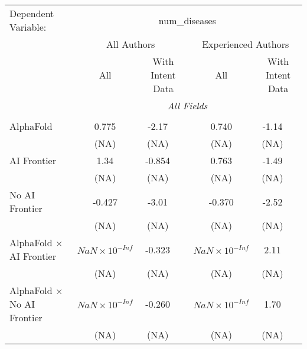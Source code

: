 \begingroup
\centering
\begin{tabular}{lcccccc}
   \tabularnewline \midrule \midrule
   Dependent Variable: & \multicolumn{6}{c}{num\_diseases}\\
 & \multicolumn{3}{c}{All Authors} & \multicolumn{3}{c}{Experienced Authors} \\
\cmidrule(lr){2-4} \cmidrule(lr){5-7}
 & \multicolumn{1}{c}{All} & \multicolumn{2}{c}{With Intent Data} & \multicolumn{1}{c}{All} & \multicolumn{2}{c}{With Intent Data} \\
\cmidrule(lr){2-2} \cmidrule(lr){3-4} \cmidrule(lr){5-5} \cmidrule(lr){6-7}
 & \multicolumn{6}{c}{\textit{All Fields}} \\ \\
   AlphaFold                                                                  & 0.775                  & -2.17  &        & 0.740                  & -1.14 &   \\   
                                                                              & (NA)                   & (NA)   &        & (NA)                   & (NA)  &   \\   
   AI Frontier                                                                & 1.34                   & -0.854 &        & 0.763                  & -1.49 &   \\   
                                                                              & (NA)                   & (NA)   &        & (NA)                   & (NA)  &   \\   
   No AI Frontier                                                             & -0.427                 & -3.01  &        & -0.370                 & -2.52 &   \\   
                                                                              & (NA)                   & (NA)   &        & (NA)                   & (NA)  &   \\   
   AlphaFold $\times$ AI Frontier                                             & $NaN\times 10^{-Inf}$  & -0.323 &        & $NaN\times 10^{-Inf}$  & 2.11  &   \\   
                                                                              & (NA)                   & (NA)   &        & (NA)                   & (NA)  &   \\   
   AlphaFold $\times$ No AI Frontier                                          & $NaN\times 10^{-Inf}$  & -0.260 &        & $NaN\times 10^{-Inf}$  & 1.70  &   \\   
                                                                              & (NA)                   & (NA)   &        & (NA)                   & (NA)  &   \\   

\end{tabular}
